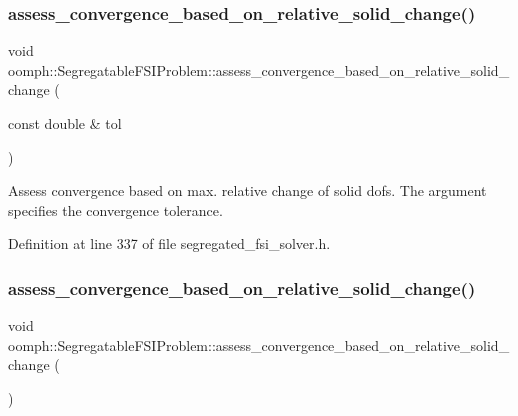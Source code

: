 \subsubsection{\texorpdfstring{assess\+\_\+convergence\+\_\+based\+\_\+on\+\_\+relative\+\_\+solid\+\_\+change()}{assess\_convergence\_based\_on\_relative\_solid\_change()}\hspace{0.1cm}{\footnotesize\ttfamily [1/2]}}
{\footnotesize\ttfamily void oomph\+::\+Segregatable\+F\+S\+I\+Problem\+::assess\+\_\+convergence\+\_\+based\+\_\+on\+\_\+relative\+\_\+solid\+\_\+change (\begin{DoxyParamCaption}\item[{const double \&}]{tol }\end{DoxyParamCaption})\hspace{0.3cm}{\ttfamily [inline]}}



Assess convergence based on max. relative change of solid dofs. The argument specifies the convergence tolerance. 



Definition at line 337 of file segregated\+\_\+fsi\+\_\+solver.\+h.

\mbox{\label{classoomph_1_1SegregatableFSIProblem_af95d2c3833b64d37635e2e07776cef54}} 
\subsubsection{\texorpdfstring{assess\+\_\+convergence\+\_\+based\+\_\+on\+\_\+relative\+\_\+solid\+\_\+change()}{assess\_convergence\_based\_on\_relative\_solid\_change()}\hspace{0.1cm}{\footnotesize\ttfamily [2/2]}}
{\footnotesize\ttfamily void oomph\+::\+Segregatable\+F\+S\+I\+Problem\+::assess\+\_\+convergence\+\_\+based\+\_\+on\+\_\+relative\+\_\+solid\+\_\+change (\begin{DoxyParamCaption}{ }\end{DoxyParamCaption})\hspace{0.3cm}{\ttfamily [inline]}}



